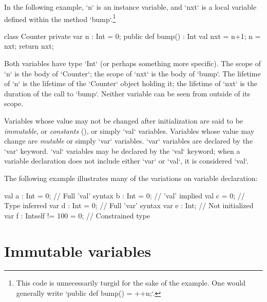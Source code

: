 \begin{ex}
In the following example, 
\xcd`n` is an instance variable, and \xcd`nxt` is a
local variable defined within the method \xcd`bump`.\footnote{This code is
unnecessarily turgid for the sake of the example.  One would generally write
\xcd`public def bump() = ++n;`.   }
\begin{xten}
class Counter {
  private var n : Int = 0;
  public def bump() : Int {
    val nxt = n+1;
    n = nxt;
    return nxt;
    }
}
\end{xten}
%
Both variables have type \xcd`Int` (or
perhaps something more specific).    The scope of \xcd`n` is the body of
\xcd`Counter`; the scope of \xcd`nxt` is the body of \xcd`bump`.  The
lifetime of \xcd`n` is the lifetime of the \xcd`Counter` object holding it;
the lifetime of \xcd`nxt` is the duration of the call to \xcd`bump`. Neither
variable can be seen from outside of its scope.
\end{ex}
\label{exploded-syntax}
\label{VariableDeclarations}


Variables whose value may not be changed after initialization are said to be
{\em immutable}, or {\em constants} (), or simply
\xcd`val` variables. Variables whose value may change are {\em mutable} or
simply \xcd`var` variables. \xcd`var` variables are declared by the \xcd`var`
keyword. \xcd`val` variables may be declared by the \xcd`val` keyword; when a
variable declaration does not include either \xcd`var` or \xcd`val`, it is
considered \xcd`val`. 


\begin{ex}
The following example illustrates many of the variations on variable
declaration: 
\begin{xten}
val a : Int = 0;               // Full 'val' syntax
b : Int = 0;                   // 'val' implied
val c = 0;                     // Type inferred
var d : Int = 0;               // Full 'var' syntax
var e : Int;                   // Not initialized
var f : Int{self != 100} = 0;  // Constrained type
\end{xten}
\end{ex}





\section{Immutable variables}
\label{FinalVariables}

